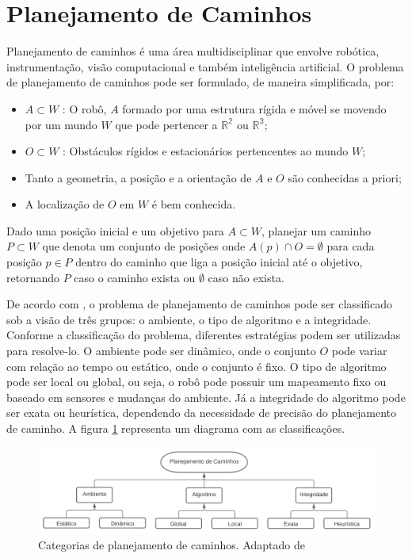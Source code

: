 \section{Planejamento de Caminhos}
Planejamento de caminhos é uma área multidisciplinar que envolve robótica, instrumentação, visão computacional e também inteligência artificial. O problema de planejamento de caminhos pode ser formulado, de maneira simplificada, por:
\begin{itemize}
    \item $ A \subset W $ : O robô, $A$ formado por uma estrutura rígida e móvel se movendo por um mundo $W$ que pode pertencer a $ \mathbb{R^2} $ ou $ \mathbb{R^3} $;
    \item $ O \subset W $ : Obstáculos rígidos e estacionários pertencentes ao mundo $W$;
    \item Tanto a geometria, a posição e a orientação de $A$ e $O$ são conhecidas a priori;
    \item A localização de $O$ em $W$ é bem conhecida.
\end{itemize}
Dado uma posição inicial e um objetivo para $A \subset W$, planejar um caminho $P \subset W$ que denota um conjunto de posições onde $ A(p)\cap O = \emptyset$ para cada posição $p \in P$ dentro do caminho que liga a posição inicial até o objetivo, retornando $P$ caso o caminho exista ou $\emptyset$ caso não exista. \cite{koubaa2018robot}
\par
De acordo com , o problema de planejamento de caminhos pode ser classificado sob a visão de três grupos: o ambiente, o tipo de algoritmo e a integridade. Conforme a classificação do problema, diferentes estratégias podem ser utilizadas para resolve-lo. O ambiente pode ser dinâmico, onde o conjunto $O$ pode variar com relação ao tempo ou estático, onde o conjunto é fixo. O tipo de algoritmo pode ser local ou global, ou seja, o robô pode possuir um mapeamento fixo ou baseado em sensores e mudanças do ambiente. Já a integridade do algoritmo pode ser exata ou heurística, dependendo da necessidade de precisão do planejamento de caminho. A figura \ref{fig:pathplanning_classificacao} representa um diagrama com as classificações.
\begin{figure}[ht]
    \centering
    \includegraphics[width=1\textwidth]{capitulos/pathplanning_classificacao.png}
    \caption{Categorias de planejamento de caminhos. Adaptado de \cite{koubaa2018robot}}
    \label{fig:pathplanning_classificacao}
\end{figure}
